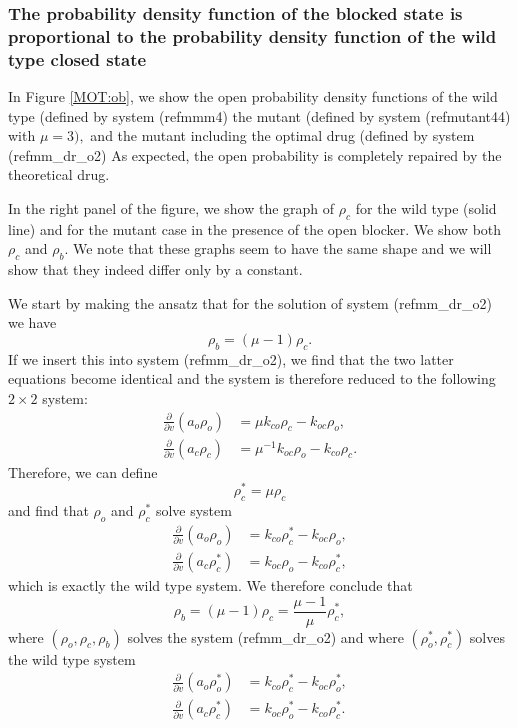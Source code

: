 \bigskip

\subsubsection{The probability density function of the blocked state is
proportional to the probability density function of the wild type closed state}


In Figure \ref{MOT:ob}, we show the open probability density functions of the
wild type
(defined by system (ref{mmm4}) the mutant (defined by system (ref{mutant44}) with $\mu=3),$ 
and the mutant including the optimal drug (defined by system 
(ref{mm_dr_o2}) As expected, the open probability is 
completely repaired by the theoretical drug.

In the right panel of the figure, we show the graph of $\rho_{c}$ for the wild type
(solid line) and for the mutant case in the presence of the open blocker. We show
both $\rho_{c}$ and $\rho_{b}$. We note that these graphs seem to have the same 
shape  and we will show that they indeed differ only by a constant. 

We start by making the ansatz that for the solution of system (ref{mm_dr_o2}) we have
\begin{equation}
\rho_{b}=\left(  \mu-1\right)  \rho_{c}. \label{mot_ans}
\end{equation}
If we insert this into system (ref{mm_dr_o2}), we find that
the two latter equations become identical and the system is therefore reduced to the following $2\times 2$
system:
\begin{align}
\frac{\partial}{\partial v}\left(  a_{o}\rho_{o}\right)   &  =\mu k_{co}
\rho_{c}-k_{oc}\rho_{o},\nonumber\\
\frac{\partial}{\partial v}\left(  a_{c}\rho_{c}\right)   &  =\mu^{-1}
k_{oc}\rho_{o}-k_{co}\rho_{c}.
\end{align}
Therefore, we can define
\[
\rho_{c}^{\ast}=\mu\rho_{c}
\]
and find that $\rho_{o}$ and $\rho_{c}^{\ast}$ solve system
\begin{align}
\frac{\partial}{\partial v}\left(  a_{o}\rho_{o}\right)   &  = k_{co}
\rho_{c}^{\ast}-k_{oc}\rho_{o},\nonumber\\
\frac{\partial}{\partial v}\left(  a_{c}\rho_{c}^{\ast}\right)   &
=k_{oc}\rho_{o}-k_{co}\rho_{c}^{\ast},
\end{align}
which is exactly the wild type system. We therefore conclude that 
\begin{equation}
\rho_{b}=\left(  \mu-1\right)  \rho_{c}=\frac{\mu-1}{\mu}  \rho^*_{c}, \label{rb}
\end{equation}
where $(\rho_{o},\rho_{c},\rho_{b})$ solves the system (ref{mm_dr_o2})
and where $(\rho^*_{o},\rho^*_{c})$ solves the wild type system
\begin{align*}
\frac{\partial}{\partial v}\left(  a_{o}\rho^*_{o}\right)   &  =k_{co}\rho^*_{c}-k_{oc}\rho^*_{o},\\
\frac{\partial}{\partial v}\left(  a_{c}\rho^*_{c}\right)   &  =k_{oc}
\rho^*_{o}-k_{co}\rho^*_{c}.
\end{align*}

